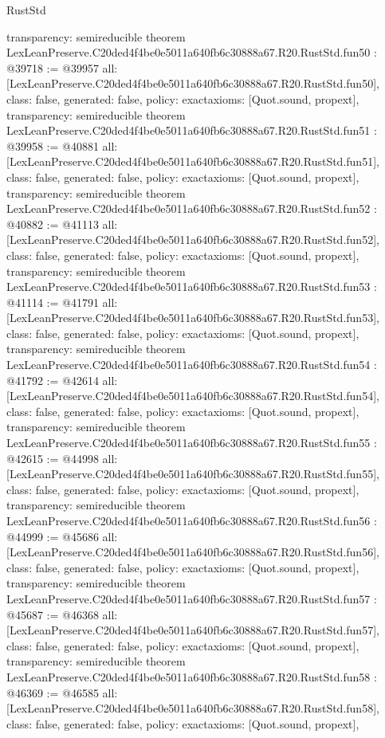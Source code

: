 \begin{lexlean}{RustStd}
\begin{coremodule}
{  transparency: semireducible
}
theorem LexLeanPreserve.C20ded4f4be0e5011a640fb6c30888a67.R20.RustStd.fun50 : @39718 := @39957 {
  all: [LexLeanPreserve.C20ded4f4be0e5011a640fb6c30888a67.R20.RustStd.fun50],
  class: false,
  generated: false,
  policy: exact{axioms: [Quot.sound, propext]},
  transparency: semireducible
}
theorem LexLeanPreserve.C20ded4f4be0e5011a640fb6c30888a67.R20.RustStd.fun51 : @39958 := @40881 {
  all: [LexLeanPreserve.C20ded4f4be0e5011a640fb6c30888a67.R20.RustStd.fun51],
  class: false,
  generated: false,
  policy: exact{axioms: [Quot.sound, propext]},
  transparency: semireducible
}
theorem LexLeanPreserve.C20ded4f4be0e5011a640fb6c30888a67.R20.RustStd.fun52 : @40882 := @41113 {
  all: [LexLeanPreserve.C20ded4f4be0e5011a640fb6c30888a67.R20.RustStd.fun52],
  class: false,
  generated: false,
  policy: exact{axioms: [Quot.sound, propext]},
  transparency: semireducible
}
theorem LexLeanPreserve.C20ded4f4be0e5011a640fb6c30888a67.R20.RustStd.fun53 : @41114 := @41791 {
  all: [LexLeanPreserve.C20ded4f4be0e5011a640fb6c30888a67.R20.RustStd.fun53],
  class: false,
  generated: false,
  policy: exact{axioms: [Quot.sound, propext]},
  transparency: semireducible
}
theorem LexLeanPreserve.C20ded4f4be0e5011a640fb6c30888a67.R20.RustStd.fun54 : @41792 := @42614 {
  all: [LexLeanPreserve.C20ded4f4be0e5011a640fb6c30888a67.R20.RustStd.fun54],
  class: false,
  generated: false,
  policy: exact{axioms: [Quot.sound, propext]},
  transparency: semireducible
}
theorem LexLeanPreserve.C20ded4f4be0e5011a640fb6c30888a67.R20.RustStd.fun55 : @42615 := @44998 {
  all: [LexLeanPreserve.C20ded4f4be0e5011a640fb6c30888a67.R20.RustStd.fun55],
  class: false,
  generated: false,
  policy: exact{axioms: [Quot.sound, propext]},
  transparency: semireducible
}
theorem LexLeanPreserve.C20ded4f4be0e5011a640fb6c30888a67.R20.RustStd.fun56 : @44999 := @45686 {
  all: [LexLeanPreserve.C20ded4f4be0e5011a640fb6c30888a67.R20.RustStd.fun56],
  class: false,
  generated: false,
  policy: exact{axioms: [Quot.sound, propext]},
  transparency: semireducible
}
theorem LexLeanPreserve.C20ded4f4be0e5011a640fb6c30888a67.R20.RustStd.fun57 : @45687 := @46368 {
  all: [LexLeanPreserve.C20ded4f4be0e5011a640fb6c30888a67.R20.RustStd.fun57],
  class: false,
  generated: false,
  policy: exact{axioms: [Quot.sound, propext]},
  transparency: semireducible
}
theorem LexLeanPreserve.C20ded4f4be0e5011a640fb6c30888a67.R20.RustStd.fun58 : @46369 := @46585 {
  all: [LexLeanPreserve.C20ded4f4be0e5011a640fb6c30888a67.R20.RustStd.fun58],
  class: false,
  generated: false,
  policy: exact{axioms: [Quot.sound, propext]},
}
\end{coremodule}
\end{lexlean}
